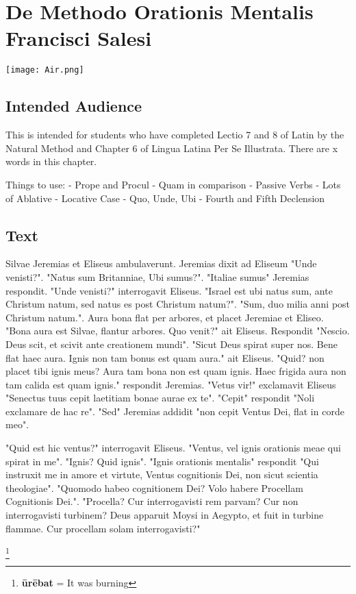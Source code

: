 \chapter{De Methodo Orationis Mentalis Francisci Salesi}
\begin{center}
\texttt{[image: Air.png]}
\end{center}

\section{Intended Audience}
This is intended for students who have completed Lectio 7 and 8 of Latin by the Natural Method and Chapter 6 of Lingua Latina Per Se Illustrata. There are x words in this chapter.

Things to use:
	- Prope and Procul
	- Quam in comparison
	- Passive Verbs
	- Lots of Ablative
	- Locative Case 
	- Quo, Unde, Ubi
	- Fourth and Fifth Declension

\section{Text}
Silvae Jeremias et Eliseus ambulaverunt. Jeremias dixit ad Eliseum "Unde venisti?". "Natus sum Britanniae, Ubi sumus?". "Italiae sumus" Jeremias respondit. "Unde venisti?" interrogavit Eliseus. "Israel est ubi natus sum, ante Christum natum, sed natus es post Christum natum?". "Sum, duo milia anni post Christum natum.". Aura bona flat per arbores, et placet Jeremiae et Eliseo. "Bona aura est Silvae, flantur arbores.  Quo venit?" ait Eliseus. Respondit "Nescio. Deus scit, et scivit ante creationem mundi". "Sicut Deus spirat super nos.  Bene flat haec aura. Ignis non tam bonus est quam aura." ait Eliseus. "Quid? non placet tibi ignis meus? Aura tam bona non est quam ignis. Haec frigida aura non tam calida est quam ignis." respondit Jeremias. "Vetus vir!" exclamavit Eliseus "Senectus tuus cepit laetitiam bonae aurae ex te". "Cepit" respondit "Noli exclamare de hac re". "Sed" Jeremias addidit "non cepit Ventus Dei, flat in corde meo". 

"Quid est hic ventus?" interrogavit Eliseus. "Ventus, vel ignis orationis meae qui spirat in me". "Ignis? Quid ignis". "Ignis orationis mentalis" respondit "Qui instruxit me in amore et virtute, Ventus cognitionis Dei, non sicut scientia theologiae". "Quomodo habeo cognitionem Dei? Volo habere Procellam Cognitionis Dei.". "Procella? Cur interrogavisti rem parvam? Cur non interrogavisti turbinem? Deus apparuit Moysi in Aegypto, et fuit in turbine flammae. Cur procellam solam interrogavisti?"   

\footnote{\textbf{ūrēbat} = It was burning}